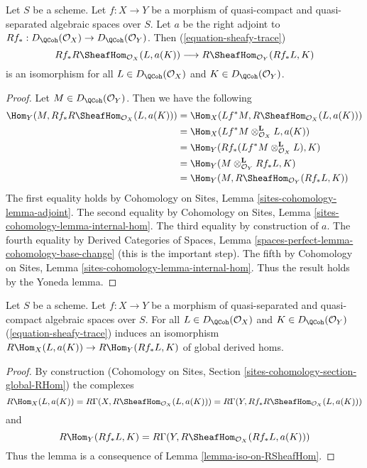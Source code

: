\begin{lemma}
\label{lemma-iso-on-RSheafHom}
Let $S$ be a scheme.
Let $f : X \to Y$ be a morphism of quasi-compact and quasi-separated
algebraic spaces over $S$.
Let $a$ be the right adjoint to
$Rf_* : D_\QCoh(\mathcal{O}_X) \to D_\QCoh(\mathcal{O}_Y)$.
Then (\ref{equation-sheafy-trace})
$$
Rf_*R\SheafHom_{\mathcal{O}_X}(L, a(K))
\longrightarrow
R\SheafHom_{\mathcal{O}_Y}(Rf_*L, K)
$$
is an isomorphism for all $L \in D_\QCoh(\mathcal{O}_X)$ and
$K \in D_\QCoh(\mathcal{O}_Y)$.
\end{lemma}

\begin{proof}
Let $M \in D_\QCoh(\mathcal{O}_Y)$. Then we have the following
\begin{align*}
\Hom_Y(M, Rf_*R\SheafHom_{\mathcal{O}_X}(L, a(K)))
& =
\Hom_X(Lf^*M, R\SheafHom_{\mathcal{O}_X}(L, a(K))) \\
& =
\Hom_X(Lf^*M \otimes_{\mathcal{O}_X}^\mathbf{L} L, a(K)) \\
& =
\Hom_Y(Rf_*(Lf^*M \otimes_{\mathcal{O}_X}^\mathbf{L} L), K) \\
& =
\Hom_Y(M \otimes_{\mathcal{O}_Y}^\mathbf{L} Rf_*L, K) \\
& =
\Hom_Y(M, R\SheafHom_{\mathcal{O}_Y}(Rf_*L, K))
\end{align*}
The first equality holds by Cohomology on Sites, Lemma
\ref{sites-cohomology-lemma-adjoint}.
The second equality by Cohomology on Sites, Lemma
\ref{sites-cohomology-lemma-internal-hom}.
The third equality by construction of $a$.
The fourth equality by Derived Categories of Spaces, Lemma
\ref{spaces-perfect-lemma-cohomology-base-change} (this is the important step).
The fifth by Cohomology on Sites, Lemma
\ref{sites-cohomology-lemma-internal-hom}.
Thus the result holds by the Yoneda lemma.
\end{proof}

\begin{lemma}
\label{lemma-iso-global-hom}
Let $S$ be a scheme.
Let $f : X \to Y$ be a morphism of quasi-separated and quasi-compact
algebraic spaces over $S$.
For all $L \in D_\QCoh(\mathcal{O}_X)$ and $K \in D_\QCoh(\mathcal{O}_Y)$
(\ref{equation-sheafy-trace}) induces an isomorphism
$R\Hom_X(L, a(K)) \to R\Hom_Y(Rf_*L, K)$ of global derived homs.
\end{lemma}

\begin{proof}
By construction (Cohomology on Sites, Section
\ref{sites-cohomology-section-global-RHom}) the complexes
$$
R\Hom_X(L, a(K)) =
R\Gamma(X, R\SheafHom_{\mathcal{O}_X}(L, a(K))) =
R\Gamma(Y, Rf_*R\SheafHom_{\mathcal{O}_X}(L, a(K)))
$$
and
$$
R\Hom_Y(Rf_*L, K) = R\Gamma(Y, R\SheafHom_{\mathcal{O}_X}(Rf_*L, a(K)))
$$
Thus the lemma is a consequence of Lemma \ref{lemma-iso-on-RSheafHom}.
\end{proof}









